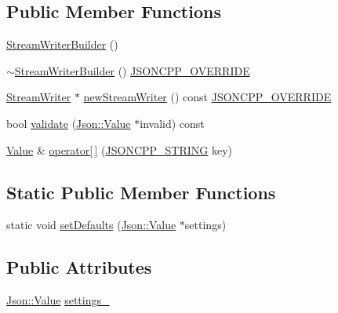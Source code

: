 \subsection*{Public Member Functions}
\begin{DoxyCompactItemize}
\item 
\hyperlink{class_json_1_1_stream_writer_builder_ab95b76179c152673ad14abc639a46ee4}{Stream\+Writer\+Builder} ()
\item 
\hyperlink{class_json_1_1_stream_writer_builder_a93263f8ef1e2d22593907075d8f0aaef}{$\sim$\+Stream\+Writer\+Builder} () \hyperlink{json_8h_a824d6199c91488107e443226fa6022c5}{J\+S\+O\+N\+C\+P\+P\+\_\+\+O\+V\+E\+R\+R\+I\+DE}
\item 
\hyperlink{class_json_1_1_stream_writer}{Stream\+Writer} $\ast$ \hyperlink{class_json_1_1_stream_writer_builder_ab9ee278609f88ae04a7c1a84e1f559e6}{new\+Stream\+Writer} () const \hyperlink{json_8h_a824d6199c91488107e443226fa6022c5}{J\+S\+O\+N\+C\+P\+P\+\_\+\+O\+V\+E\+R\+R\+I\+DE}
\item 
bool \hyperlink{class_json_1_1_stream_writer_builder_a12353b97766841db7d049da84658da09}{validate} (\hyperlink{class_json_1_1_value}{Json\+::\+Value} $\ast$invalid) const
\item 
\hyperlink{class_json_1_1_value}{Value} \& \hyperlink{class_json_1_1_stream_writer_builder_af68f6b59cb20b074052ed12bb3d336a3}{operator\mbox{[}$\,$\mbox{]}} (\hyperlink{json_8h_a1e723f95759de062585bc4a8fd3fa4be}{J\+S\+O\+N\+C\+P\+P\+\_\+\+S\+T\+R\+I\+NG} key)
\end{DoxyCompactItemize}
\subsection*{Static Public Member Functions}
\begin{DoxyCompactItemize}
\item 
static void \hyperlink{class_json_1_1_stream_writer_builder_a53bf106b141e28637b01ad0ecd2acbf6}{set\+Defaults} (\hyperlink{class_json_1_1_value}{Json\+::\+Value} $\ast$settings)
\end{DoxyCompactItemize}
\subsection*{Public Attributes}
\begin{DoxyCompactItemize}
\item 
\hyperlink{class_json_1_1_value}{Json\+::\+Value} \hyperlink{class_json_1_1_stream_writer_builder_a79bdf2e639a52f4e758c0b95bd1d3423}{settings\+\_\+}
\end{DoxyCompactItemize}


